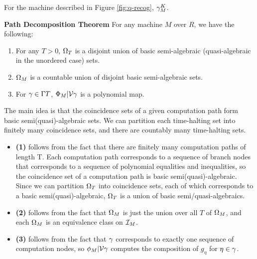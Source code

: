   \begin{example}
    
    For the machine described in Figure \ref{fig:q-recog}, $\gamma_M^K$.

  \end{example}

  \begin{theorem}{\textbf{Path Decomposition Theorem}}
    For any machine $M$ over $R$, we have the following:

    \begin{enumerate}
    \item For any $T > 0$, $\Omega_T$ is a disjoint union of basic
      semi-algebraic (quasi-algebraic in the unordered case) sets.

    \item $\Omega_M$ is a countable union of disjoint basic
      semi-algebraic sets.

    \item For $\gamma \in \Gamma{T}$,
      $\Phi_M|\mathcal{V}{\gamma}$ is a polynomial map.
    \end{enumerate}
  \end{theorem}

  \begin{proofsketch}
    
    The main idea is that the coincidence sets of a given computation
    path form basic semi(quasi)-algebraic sets.  We can partition
    each time-halting set into finitely many coincidence sets, and
    there are countably many time-halting sets.

    \begin{itemize}
    \item \textbf{(1)} follows from the fact that there are finitely
      many computation paths of length T.  Each computation path
      corresponds to a sequence of branch nodes that corresponds to a
      sequence of polynomial equalities and inequalities, so the
      coincidence set of a computation path is basic
      semi(quasi)-algebraic. Since we can partition $\Omega_T$ into
      coincidence sets, each of which corresponds to a basic
      semi(quasi)-algebraic, $\Omega_T$ is a union of basic
      semi/quasi-algebraics.
    \item \textbf{(2)} follows from the fact that $\Omega_M$ is just
      the union over all $T$ of $\Omega_M$, and each $\Omega_M$ is
      an equivalence class on $\mathcal{I}_M$.
    \item \textbf{(3)} follows from the fact that $\gamma$
      corresponds to exactly one sequence of computation nodes, so
      $\phi_M|\mathcal{V}{\gamma}$ computes the composition of
      $g_{\eta}$ for $\eta \in \gamma$.
    \end{itemize}
  \end{proofsketch}
  
